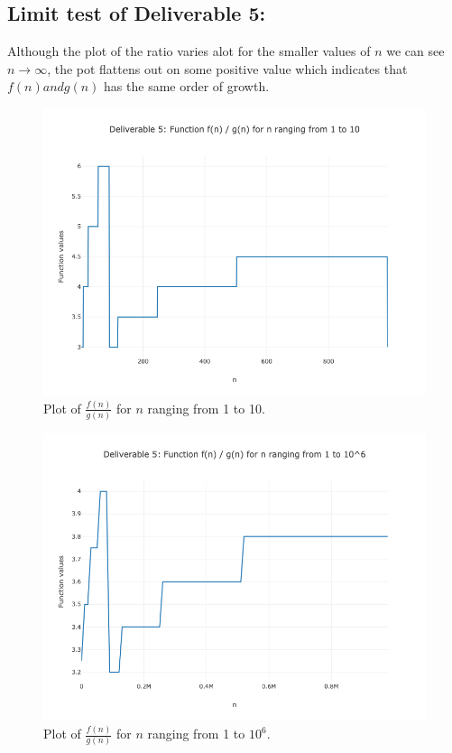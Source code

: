 \documentclass{article}
\begin{document}
\subsection{Limit test of Deliverable 5: }
Although the plot of the ratio varies alot for the smaller values of \(n\) we can see \(n \to \infty\), the pot flattens out on some positive value which indicates that \(f(n) and g(n)\) has the same order of growth. 
\begin{figure}[H]
    \centering
    \includegraphics[width=\textwidth]{Deliverable 51: plot_1_to_1000.png}
    \caption{Plot of \(\frac{f(n)}{g(n)}\) for $n$ ranging from 1 to 10.}
    \label{del51: plot_1_to_10}
\end{figure}

\begin{figure}[H]
    \centering
    \includegraphics[width=\textwidth]{Deliverable 51: plot_1_to_1000000.png}
    \caption{Plot of \(\frac{f(n)}{g(n)}\) for $n$ ranging from 1 to $10^6$.}
    \label{del51: plot_1_to10^6}
\end{figure}
\end{document}
